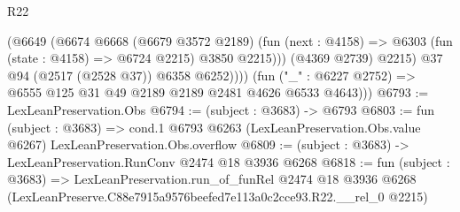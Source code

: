 \begin{lexlean}{R22}
\begin{coremodule}
                  (@6649
                    (@6674
                      @6668
                      (@6679 @3572 @2189)
                      (fun (next : @4158) =>
                      @6303 (fun (state : @4158) => @6724 @2215) @3850 @2215)))
                  (@4369 @2739)
                  @2215)
                @37
                @94
                (@2517 (@2528 @37))
                @6358
                @6252))))
        (fun ("_" : @6227 @2752) => @6555 @125 @31 @49 @2189 @2189 @2481 @4626 @6533 @4643)))
@6793 := LexLeanPreservation.Obs
@6794 := (subject : @3683) -> @6793
@6803 := fun (subject : @3683) =>
  cond.{1} @6793 @6263 (LexLeanPreservation.Obs.value @6267) LexLeanPreservation.Obs.overflow
@6809 := (subject : @3683) -> LexLeanPreservation.RunConv @2474 @18 @3936 @6268
@6818 := fun (subject : @3683) =>
  LexLeanPreservation.run_of_funRel
    @2474
    @18
    @3936
    @6268
    (LexLeanPreserve.C88e7915a9576beefed7e113a0c2cce93.R22.__rel_0 @2215)
\end{coremodule}
\end{lexlean}
